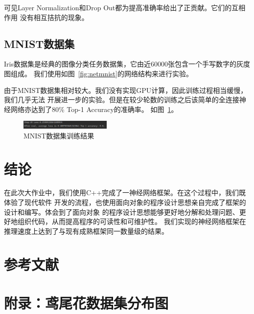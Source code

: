 \documentclass[a4paper,twoside,twocolumn]{article}
\begin{document}
\begin{spacing}{1.2}
可见Layer Normalization和Drop Out都为提高准确率给出了正贡献。它们的互相作用
没有相互拮抗的现象。


\subsection{MNIST数据集}

Iris数据集是经典的图像分类任务数据集，它由近60000张包含一个手写数字的灰度图组成。
我们使用如图~\ref{fig:netmnist}的网络结构来进行实验。

由于MNIST数据集相对较大。我们没有实现GPU计算，因此训练过程相当缓慢，我们几乎无法
开展进一步的实验。但是在较少轮数的训练之后该简单的全连接神经网络亦达到了80\% Top-1 Accuracy的准确率。
如图~\ref{fig:mnist_result}。

\begin{figure}[H]
	\centering
	\caption{MNIST数据集训练结果}
	\label{fig:mnist_result}
	\includegraphics[width=0.4\textwidth]{res_mnist.png}
\end{figure}

\section{结论}

在此次大作业中，我们使用C++完成了一神经网络框架。在这个过程中，我们既体验了现代软件
开发的流程，也使用面向对象的程序设计思想亲自完成了框架的设计和编写。体会到了面向对象
的程序设计思想能够更好地分解和处理问题、更好地组织代码，从而提高程序的可读性和可维护性。
我们实现的神经网络框架在推理速度上达到了与现有成熟框架同一数量级的结果。

\end{spacing}

\clearpage
\onecolumn

\section*{参考文献}




\appendix
\section*{附录：鸢尾花数据集分布图}
\label{sec:iris}
\end{document}
